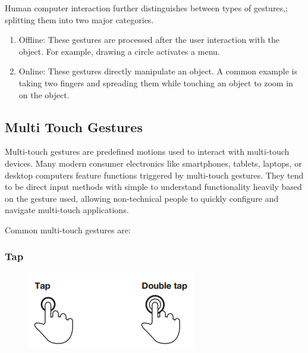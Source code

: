 \documentclass[11pt]{report}
\begin{document}
Human computer interaction further distinguishes between types of gestures,; splitting them into two major categories.

\begin{enumerate}

\item Offline: These gestures are processed after the user interaction with the object. For example, drawing a circle activates a menu.

\item Online: These gestures directly manipulate an object. A common example is taking two fingers and spreading them while touching an object to zoom in on the object.
\end{enumerate} 



\subsection{Multi Touch Gestures}

Multi-touch gestures are predefined motions used to interact with multi-touch devices.
Many modern consumer electronics like smartphones, tablets, laptops, or desktop computers feature functions triggered by multi-touch gestures.
They tend to be direct input methods with simple to understand functionality heavily based on the gesture used, allowing non-technical people to quickly configure and navigate multi-touch applications.

Common multi-touch gestures are:

\subsubsection{Tap}

\begin{figure}
\includegraphics[width=\textwidth]{Taps}
\end{figure}
\end{document}
